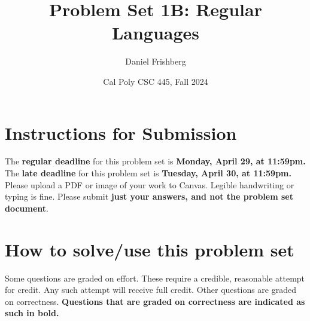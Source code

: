 \documentclass{article}
\title{Problem Set 1B: Regular Languages}
\author{Daniel Frishberg}
\date{Cal Poly CSC 445, Fall 2024}
\theoremstyle{definition}
\begin{document}
\lstset{upquote=true}
\setlength\parindent{0em}

\maketitle
\section{Instructions for Submission}
The \textbf{regular deadline} for this problem set is \textbf{Monday, April 29, at 11:59pm.} The \textbf{late deadline} for this problem set is \textbf{Tuesday, April 30, at 11:59pm.} Please upload a PDF or image of your work to Canvas. Legible handwriting or typing is fine. Please submit \textbf{just your answers, and not the problem set document}.

\section{How to solve/use this problem set}
Some questions are graded on effort. These require a credible, reasonable attempt for credit. Any such attempt will receive full credit. Other questions are graded on correctness.
\textbf{Questions that are graded on correctness are indicated as such in bold.}
\end{document}
